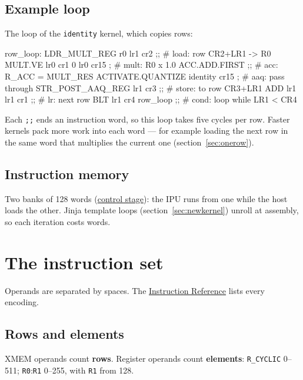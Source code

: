 \documentclass[11pt,a4paper]{article}
\newcommand{\doc}[2]{\href{https://rechefe.github.io/ipu-emulator/#1/}{\textcolor{accent}{#2}}}
\begin{document}
\needspace{7cm}
\subsection{Example loop}

The loop of the \texttt{identity} kernel, which copies rows:

\begin{pycode}
row_loop:
    LDR_MULT_REG r0 lr1 cr2 ;;          # load:  row CR2+LR1 -> R0
    MULT.VE lr0 cr1 0 lr0 cr15 ;        # mult:  R0 x 1.0
    ACC.ADD.FIRST ;;                    # acc:   R_ACC = MULT_RES
    ACTIVATE.QUANTIZE identity cr15 ;   # aaq:   pass through
    STR_POST_AAQ_REG lr1 cr3 ;;         # store: to row CR3+LR1
    ADD lr1 lr1 cr1 ;;                  # lr:    next row
    BLT lr1 cr4 row_loop ;;             # cond:  loop while LR1 < CR4
\end{pycode}

Each \texttt{;;} ends an instruction word, so this loop takes five cycles per
row. Faster kernels pack more work into each word --- for example loading the
next row in the same word that multiplies the current one
(section~\ref{sec:onerow}).

\subsection{Instruction memory}

Two banks of 128 words (\doc{specs/stage-control}{control stage}): the IPU
runs from one while the host loads the other. Jinja template loops (section~\ref{sec:newkernel}) unroll at assembly, so
each iteration costs words.

\section{The instruction set}\label{sec:isa}

Operands are separated by spaces. The \doc{instructions}{Instruction Reference}
lists every encoding.

\subsection{Rows and elements}

XMEM operands count \textbf{rows}. Register operands count \textbf{elements}:
\texttt{R\_CYCLIC} 0--511; \texttt{R0}:\texttt{R1} 0--255, with \texttt{R1}
from 128.
\end{document}
